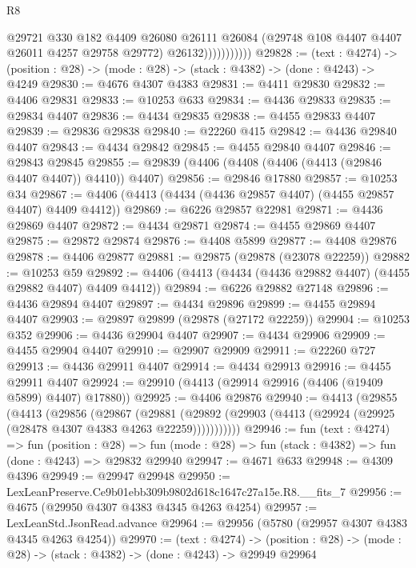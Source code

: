 \begin{lexlean}{R8}
\begin{coremodule}
                        @29721
                          @330
                          @182
                          @4409
                          @26080
                          @26111
                          @26084
                          (@29748 @108 @4407 @4407 @26011 @4257 @29758 @29772)
                          @26132)))))))))))
@29828 := (text : @4274) ->
  (position : @28) -> (mode : @28) -> (stack : @4382) -> (done : @4243) -> @4249
@29830 := @4676 @4307 @4383
@29831 := @4411 @29830
@29832 := @4406 @29831
@29833 := @10253 @633
@29834 := @4436 @29833
@29835 := @29834 @4407
@29836 := @4434 @29835
@29838 := @4455 @29833 @4407
@29839 := @29836 @29838
@29840 := @22260 @415
@29842 := @4436 @29840 @4407
@29843 := @4434 @29842
@29845 := @4455 @29840 @4407
@29846 := @29843 @29845
@29855 := @29839 (@4406 (@4408 (@4406 (@4413 (@29846 @4407 @4407)) @4410)) @4407)
@29856 := @29846 @17880
@29857 := @10253 @34
@29867 := @4406 (@4413 (@4434 (@4436 @29857 @4407) (@4455 @29857 @4407) @4409 @4412))
@29869 := @6226 @29857 @22981
@29871 := @4436 @29869 @4407
@29872 := @4434 @29871
@29874 := @4455 @29869 @4407
@29875 := @29872 @29874
@29876 := @4408 @5899
@29877 := @4408 @29876
@29878 := @4406 @29877
@29881 := @29875 (@29878 (@23078 @22259))
@29882 := @10253 @59
@29892 := @4406 (@4413 (@4434 (@4436 @29882 @4407) (@4455 @29882 @4407) @4409 @4412))
@29894 := @6226 @29882 @27148
@29896 := @4436 @29894 @4407
@29897 := @4434 @29896
@29899 := @4455 @29894 @4407
@29903 := @29897 @29899 (@29878 (@27172 @22259))
@29904 := @10253 @352
@29906 := @4436 @29904 @4407
@29907 := @4434 @29906
@29909 := @4455 @29904 @4407
@29910 := @29907 @29909
@29911 := @22260 @727
@29913 := @4436 @29911 @4407
@29914 := @4434 @29913
@29916 := @4455 @29911 @4407
@29924 := @29910 (@4413 (@29914 @29916 (@4406 (@19409 @5899) @4407) @17880))
@29925 := @4406 @29876
@29940 := @4413
    (@29855
      (@4413
        (@29856
          (@29867
            (@29881
              (@29892 (@29903 (@4413 (@29924 (@29925 (@28478 @4307 @4383 @4263 @22259)))))))))))
@29946 := fun (text : @4274) =>
  fun (position : @28) =>
  fun (mode : @28) => fun (stack : @4382) => fun (done : @4243) => @29832 @29940
@29947 := @4671 @633
@29948 := @4309 @4396
@29949 := @29947 @29948
@29950 := LexLeanPreserve.Ce9b01ebb309b9802d618c1647c27a15e.R8.__fits_7
@29956 := @4675 (@29950 @4307 @4383 @4345 @4263 @4254)
@29957 := LexLeanStd.JsonRead.advance
@29964 := @29956 (@5780 (@29957 @4307 @4383 @4345 @4263 @4254))
@29970 := (text : @4274) ->
  (position : @28) -> (mode : @28) -> (stack : @4382) -> (done : @4243) -> @29949 @29964

\end{coremodule}
\end{lexlean}
